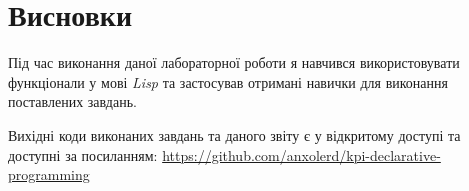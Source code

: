 \documentclass[a4paper, 12pt]{extarticle}
\begin{document}
\section{Висновки}

Під час виконання даної лабораторної роботи я навчився використовувати функціонали у мові \textit{Lisp} та застосував отримані навички для виконання поставлених завдань.

Вихідні коди виконаних завдань та даного звіту є у відкритому доступі та доступні за посиланням: \url{https://github.com/anxolerd/kpi-declarative-programming}
\end{document}
